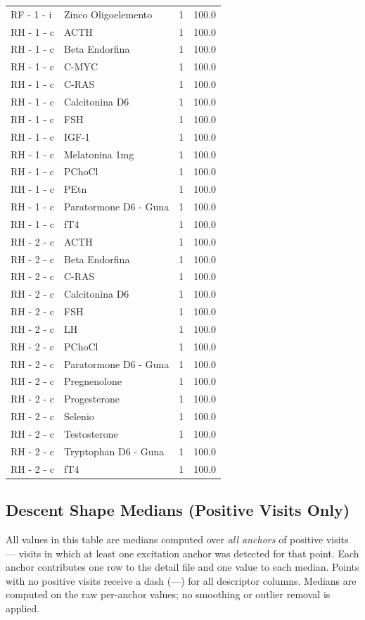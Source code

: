 \documentclass[a4paper,11pt]{article}
\begin{document}
\begin{footnotesize}
\begin{longtable}{p{3.5cm}p{7.5cm}rr}
RF - 1 - i & Zinco Oligoelemento & 1 & 100.0 \\
RH - 1 - c & ACTH & 1 & 100.0 \\
RH - 1 - c & Beta Endorfina & 1 & 100.0 \\
RH - 1 - c & C-MYC & 1 & 100.0 \\
RH - 1 - c & C-RAS & 1 & 100.0 \\
RH - 1 - c & Calcitonina D6 & 1 & 100.0 \\
RH - 1 - c & FSH & 1 & 100.0 \\
RH - 1 - c & IGF-1 & 1 & 100.0 \\
RH - 1 - c & Melatonina 1mg & 1 & 100.0 \\
RH - 1 - c & PChoCl & 1 & 100.0 \\
RH - 1 - c & PEtn & 1 & 100.0 \\
RH - 1 - c & Paratormone D6 - Guna & 1 & 100.0 \\
RH - 1 - c & fT4 & 1 & 100.0 \\
RH - 2 - c & ACTH & 1 & 100.0 \\
RH - 2 - c & Beta Endorfina & 1 & 100.0 \\
RH - 2 - c & C-RAS & 1 & 100.0 \\
RH - 2 - c & Calcitonina D6 & 1 & 100.0 \\
RH - 2 - c & FSH & 1 & 100.0 \\
RH - 2 - c & LH & 1 & 100.0 \\
RH - 2 - c & PChoCl & 1 & 100.0 \\
RH - 2 - c & Paratormone D6 - Guna & 1 & 100.0 \\
RH - 2 - c & Pregnenolone & 1 & 100.0 \\
RH - 2 - c & Progesterone & 1 & 100.0 \\
RH - 2 - c & Selenio & 1 & 100.0 \\
RH - 2 - c & Testosterone & 1 & 100.0 \\
RH - 2 - c & Tryptophan D6 - Guna & 1 & 100.0 \\
RH - 2 - c & fT4 & 1 & 100.0 \\
\end{longtable}
\end{footnotesize}

\subsection{Descent Shape Medians (Positive Visits Only)}

All values in this table are medians computed over \emph{all anchors} of positive visits ---
visits in which at least one excitation anchor was detected for that point. Each anchor
contributes one row to the detail file and one value to each median. Points with no positive
visits receive a dash (---) for all descriptor columns.
Medians are computed on the raw per-anchor values; no smoothing or outlier removal is
applied.
\end{document}
